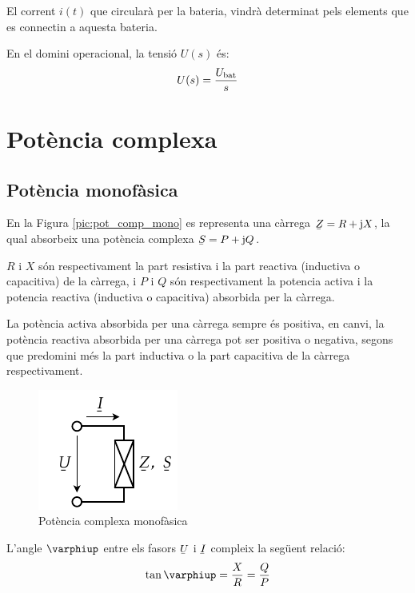El corrent $i(t)$ que circular\`{a} per la bateria, vindr\`{a} determinat
pels elements que es connectin a aquesta bateria.

 En el domini operacional, la
tensi\'{o} $U(s)$ \'{e}s:
\begin{equation}
   U(s) = \frac{U_\mathrm{bat}}{s}
\end{equation}

\section{Pot\`{e}ncia complexa}\label{sec:pot_complex} 

\subsection{Pot\`{e}ncia monof\`{a}sica} 

En la Figura \vref{pic:pot_comp_mono} es representa una c\`{a}rrega $\cmplx{Z}=R+\ju X$, la
qual absorbeix una pot\`{e}ncia complexa $\cmplx{S} = P + \ju Q$.

$R$ i $X$ s\'{o}n respectivament la part resistiva i la part reactiva
(inductiva o capacitiva) de la c\`{a}rrega, i $P$ i $Q$ s\'{o}n
respectivament la potencia activa i la potencia reactiva (inductiva
o capacitiva) absorbida per la c\`{a}rrega.

La pot\`{e}ncia activa absorbida per una c\`{a}rrega sempre \'{e}s positiva, en
canvi, la pot\`{e}ncia reactiva absorbida per una c\`{a}rrega pot ser
positiva o negativa, segons que predomini m\'{e}s la part inductiva o la
part capacitiva de la c\`{a}rrega respectivament.

\begin{figure}[htb]
\centering
    \includegraphics{Imatges/Cap-Fonaments-Potencia-Monof.pdf}
\caption{Pot\`{e}ncia complexa monof\`{a}sica} \label{pic:pot_comp_mono}
\end{figure}

L'angle $\varphiup$ entre els fasors $\cmplx{U}$ i $\cmplx{I}$ compleix la seg\"{u}ent relaci\'{o}:
\begin{equation}
   \tan\varphiup = \frac{X}{R} = \frac{Q}{P}
\end{equation}

